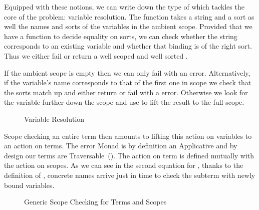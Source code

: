 Equipped with these notions, we can write down the type of  which
tackles the core of the problem: variable resolution. The function takes a
string and a sort as well the names and sorts of the variables in the ambient
scope. Provided that we have a function  to decide equality on sorts,
we can check whether the string corresponds to an existing variable and whether
that binding is of the right sort. Thus we either fail or return a well scoped
and well sorted .

If the ambient scope is empty then we can only fail with an  error.
Alternatively, if the variable's name corresponds to that of the first one
in scope we check that the sorts match up and either return  or fail
with a  error. Otherwise we look for the variable further
down the scope and use  to lift the result to the full scope.

\begin{figure}[h]
\caption{Variable Resolution}
\end{figure}

Scope checking an entire term then amounts to lifting this action on
variables to an action on terms. The error Monad  is by
definition an Applicative and by design our terms are
Traversable~(\cite{bird_paterson_1999,DBLP:journals/jfp/GibbonsO09}).
The action on term is defined mutually with the action on scopes.
As we can see in the second equation for , thanks to the
definition of , concrete names arrive just in time to
check the subterm with newly bound variables.

\begin{figure}[h]
\caption{Generic Scope Checking for Terms and Scopes}
\end{figure}

